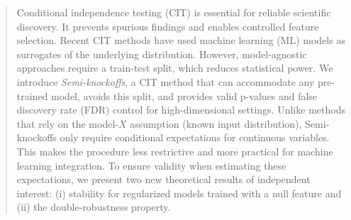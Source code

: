\documentclass{article}
\theoremstyle{plain}
\theoremstyle{definition}
\theoremstyle{remark}
\begin{document}
\begin{abstract}


Conditional independence testing (CIT) is essential for reliable scientific discovery. It prevents spurious findings and enables controlled feature selection.
%
Recent CIT methods have used machine learning (ML) models as surrogates of the underlying distribution. However, model-agnostic approaches require a train-test split, which reduces statistical power. 
%
We introduce \emph{Semi-knockoffs}, a CIT method that can accommodate any pre-trained model, avoids this split, and provides valid p-values and false discovery rate (FDR) control for high-dimensional settings. 
%
Unlike methods that rely on the model-$X$ assumption (known input distribution), Semi-knockoffs only require conditional expectations for continuous variables. This makes the procedure less restrictive and more practical for machine learning integration. 
%
To ensure validity when estimating these expectations, we present two new theoretical results of independent interest: (i) stability for regularized models trained with a null feature and (ii) the double-robustness property.


\end{abstract}
\end{document}
